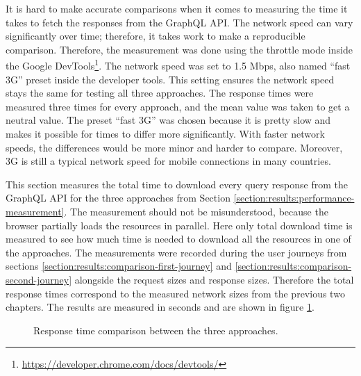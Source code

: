 It is hard to make accurate comparisons when it comes to measuring the time it takes to fetch the responses from the GraphQL \ac{API}. The network speed can vary significantly over time; therefore, it takes work to make a reproducible comparison. Therefore, the measurement was done using the throttle mode inside the Google DevTools\footnote{\url{https://developer.chrome.com/docs/devtools/}}. The network speed was set to 1.5 Mbps, also named \enquote{fast 3G} preset inside the developer tools. This setting ensures the network speed stays the same for testing all three approaches. The response times were measured three times for every approach, and the mean value was taken to get a neutral value. The preset \enquote{fast 3G} was chosen because it is pretty slow and makes it possible for times to differ more significantly. With faster network speeds, the differences would be more minor and harder to compare. Moreover, 3G is still a typical network speed for mobile connections in many countries.

\bigskip

\noindent This section measures the total time to download every query response from the GraphQL \ac{API} for the three approaches from Section \ref{section:results:performance-measurement}. The measurement should not be misunderstood, because the browser partially loads the resources in parallel. Here only total download time is measured to see how much time is needed to download all the resources in one of the approaches. The measurements were recorded during the user journeys from sections \ref{section:results:comparison-first-journey} and \ref{section:results:comparison-second-journey} alongside the request sizes and response sizes. Therefore the total response times correspond to the measured network sizes from the previous two chapters. The results are measured in seconds and are shown in figure \ref{fig:discussion:response-times}. 

\begin{figure}[H]
  \centering
  \caption{Response time comparison between the three approaches.}\label{fig:discussion:response-times}
\end{figure}

